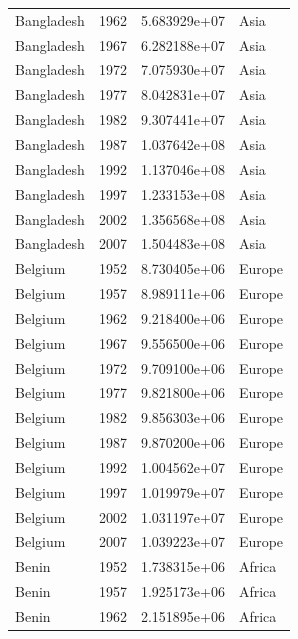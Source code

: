 \documentclass[
  letterpaper,
  DIV=11,
  numbers=noendperiod]{scrreprt}
\begin{document}
\begin{tcolorbox}
\begin{tabular}{lrrl}
Bangladesh               &  1962 &  5.683929e+07 &      Asia \\
Bangladesh               &  1967 &  6.282188e+07 &      Asia \\
Bangladesh               &  1972 &  7.075930e+07 &      Asia \\
Bangladesh               &  1977 &  8.042831e+07 &      Asia \\
Bangladesh               &  1982 &  9.307441e+07 &      Asia \\
Bangladesh               &  1987 &  1.037642e+08 &      Asia \\
Bangladesh               &  1992 &  1.137046e+08 &      Asia \\
Bangladesh               &  1997 &  1.233153e+08 &      Asia \\
Bangladesh               &  2002 &  1.356568e+08 &      Asia \\
Bangladesh               &  2007 &  1.504483e+08 &      Asia \\
Belgium                  &  1952 &  8.730405e+06 &    Europe \\
Belgium                  &  1957 &  8.989111e+06 &    Europe \\
Belgium                  &  1962 &  9.218400e+06 &    Europe \\
Belgium                  &  1967 &  9.556500e+06 &    Europe \\
Belgium                  &  1972 &  9.709100e+06 &    Europe \\
Belgium                  &  1977 &  9.821800e+06 &    Europe \\
Belgium                  &  1982 &  9.856303e+06 &    Europe \\
Belgium                  &  1987 &  9.870200e+06 &    Europe \\
Belgium                  &  1992 &  1.004562e+07 &    Europe \\
Belgium                  &  1997 &  1.019979e+07 &    Europe \\
Belgium                  &  2002 &  1.031197e+07 &    Europe \\
Belgium                  &  2007 &  1.039223e+07 &    Europe \\
Benin                    &  1952 &  1.738315e+06 &    Africa \\
Benin                    &  1957 &  1.925173e+06 &    Africa \\
Benin                    &  1962 &  2.151895e+06 &    Africa \\

\end{tabular}
\end{tcolorbox}
\end{document}
